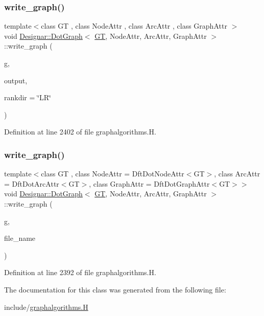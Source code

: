 \subsubsection{\texorpdfstring{write\+\_\+graph()}{write\_graph()}\hspace{0.1cm}{\footnotesize\ttfamily [1/2]}}
{\footnotesize\ttfamily template$<$class GT , class Node\+Attr , class Arc\+Attr , class Graph\+Attr $>$ \\
void \hyperlink{class_designar_1_1_dot_graph}{Designar\+::\+Dot\+Graph}$<$ \hyperlink{demo-buildgraph_8_c_a3001c40d2c31ca87ed96cd7d1334a55e}{GT}, Node\+Attr, Arc\+Attr, Graph\+Attr $>$\+::write\+\_\+graph (\begin{DoxyParamCaption}\item[{const \hyperlink{demo-buildgraph_8_c_a3001c40d2c31ca87ed96cd7d1334a55e}{GT} \&}]{g,  }\item[{std\+::ofstream \&}]{output,  }\item[{const std\+::string \&}]{rankdir = {\ttfamily \char`\"{}LR\char`\"{}} }\end{DoxyParamCaption})}



Definition at line 2402 of file graphalgorithms.\+H.

\mbox{\label{class_designar_1_1_dot_graph_a6f2b98b76d2c970ad875a59388f693cb}} 
\subsubsection{\texorpdfstring{write\+\_\+graph()}{write\_graph()}\hspace{0.1cm}{\footnotesize\ttfamily [2/2]}}
{\footnotesize\ttfamily template$<$class GT , class Node\+Attr  = Dft\+Dot\+Node\+Attr$<$\+G\+T$>$, class Arc\+Attr  = Dft\+Dot\+Arc\+Attr$<$\+G\+T$>$, class Graph\+Attr  = Dft\+Dot\+Graph\+Attr$<$\+G\+T$>$$>$ \\
void \hyperlink{class_designar_1_1_dot_graph}{Designar\+::\+Dot\+Graph}$<$ \hyperlink{demo-buildgraph_8_c_a3001c40d2c31ca87ed96cd7d1334a55e}{GT}, Node\+Attr, Arc\+Attr, Graph\+Attr $>$\+::write\+\_\+graph (\begin{DoxyParamCaption}\item[{const \hyperlink{demo-buildgraph_8_c_a3001c40d2c31ca87ed96cd7d1334a55e}{GT} \&}]{g,  }\item[{const std\+::string \&}]{file\+\_\+name }\end{DoxyParamCaption})\hspace{0.3cm}{\ttfamily [inline]}}



Definition at line 2392 of file graphalgorithms.\+H.



The documentation for this class was generated from the following file\+:\begin{DoxyCompactItemize}
\item 
include/\hyperlink{graphalgorithms_8_h}{graphalgorithms.\+H}\end{DoxyCompactItemize}
